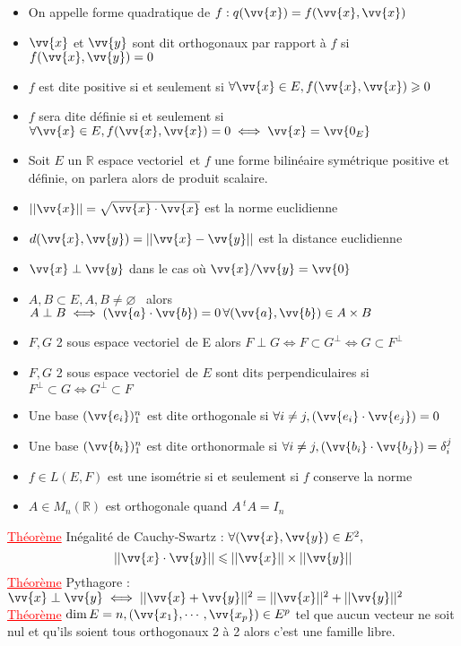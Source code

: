 \documentclass[a4paper, 11pts, french]{article}
\newcommand{\R}{\mathbb{R}}
\newcommand{\ev}{espace vectoriel}
\newcommand{\de}{\delta}
\newcommand{\thm}{\textcolor{red}{\underline{Théorème} }}
\begin{document}
	 \begin{itemize}
		\item On appelle forme quadratique de $f: q(\vv{x})=f(\vv{x},\vv{x})$
		\item $\vv{x}$ et $\vv{y}$ sont dit orthogonaux par rapport à $f$ si $f(\vv{x},\vv{y})=0$
		\item $f$ est dite positive si et seulement si $\forall \vv{x} \in  E, f(\vv{x},\vv{x})\geqslant 0$
		\item $f$ sera dite définie si et seulement si ${\forall \vv{x} \in  E}, f(\vv{x},\vv{x})=0 \iff \vv{x}=\vv{0_E}$
		\item Soit $E$ un $\R$ \ev \, et $f$ une forme bilinéaire symétrique positive et définie, on parlera alors de produit scalaire.
		\item $||\vv{x}||=\sqrt{\vv{x} \cdot \vv{x}}$ est la norme euclidienne
		\item $d(\vv{x},\vv{y})=||\vv{x}-\vv{y}||$ est la distance euclidienne
		\item $\vv{x}\perp\vv{y}$ dans le cas où $\vv{x}/\vv{y}=\vv{0}$
		\item $A,B \subset E, A,B \neq \varnothing$ \, alors $A\perp B \iff {(\vv{a}\cdot\vv{b})=0} \, {\forall (\vv{a},\vv{b}) \in A\times B}$
		\item $F,G$ 2 sous \ev \, de E alors $F\perp G \iff F\subset G^{\perp} \iff G \subset F^{\perp}$
		\item $F,G$ 2 sous \ev \, de $E$ sont dits perpendiculaires si ${F^{\perp} \subset G \iff G^{\perp} \subset F}$
		\item Une base $(\vv{e_i})_1^n$ est dite orthogonale si $\forall i \neq j, (\vv{e_i}\cdot \vv{e_j})=0$
		\item Une base $(\vv{b_i})_1^n$ est dite orthonormale si $\forall i \neq j, (\vv{b_i}\cdot \vv{b_j})=\de_i^j$
		\item $f \in L(E,F)$ est une isométrie si et seulement si $f$ conserve la norme 
		\item $A \in M_n(\R)$ est orthogonale quand $A\,^tA=I_n$
	 \end{itemize}
	  \thm Inégalité de Cauchy-Swartz : \(\forall (\vv{x},\vv{y}) \in E^2,\)
	\[||\vv{x}\cdot\vv{y}|| \leqslant ||\vv{x}|| \times ||\vv{y}||\]
	  \thm Pythagore : $\vv{x} \perp \vv{y} \iff {||\vv{x}+\vv{y}||^2=||\vv{x}||^2+||\vv{y}||^2}$ \\
	  \thm $\dim E=n, (\vv{x_1},\cdots,\vv{x_p}) \in E^p$ tel que aucun vecteur ne soit nul et qu'ils soient tous orthogonaux 2 à 2 alors c'est une famille libre. \\
\end{document}

